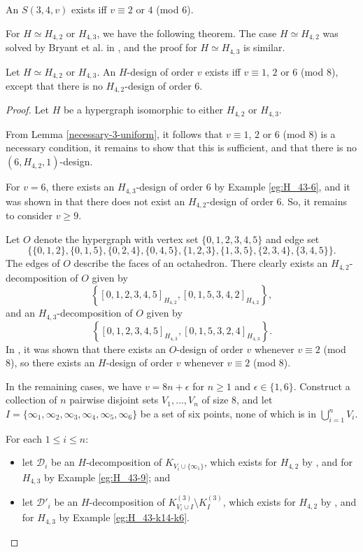 \begin{theorem} \label{thm:K4^3}
An $S(3, 4, v)$ exists iff $v \equiv 2$ or $4$ (mod $6$).
\end{theorem}


For $H \simeq H_{4,2}$ or $H_{4,3}$, we have the following theorem.
The case $H \simeq H_{4,2}$ was solved by Bryant et al. in \cite{bryant}, and the proof for $H \simeq H_{4,3}$ is similar.

\begin{theorem} \label{thm:H_42,H_43}
Let $H \simeq H_{4,2}$ or $H_{4,3}$.
An $H$-design of order $v$ exists iff $v \equiv 1$, $2$ or $6$ (mod $8$),
  except that there is no $H_{4,2}$-design of order $6$.
\end{theorem}

\begin{proof}
Let $H$ be a hypergraph isomorphic to either $H_{4,2}$ or $H_{4,3}$.

From Lemma \ref{necessary-3-uniform}, it follows that $v \equiv 1$, $2$ or $6$ (mod $8$) is a necessary condition,
   it remains to show that this is sufficient, and that there is no $(6, H_{4,2}, 1)$-design.

For $v = 6$, there exists an $H_{4,3}$-design of order 6 by Example \ref{eg:H_43-6},
  and it was shown in \cite{bryant} that there does not exist an $H_{4,2}$-design of order 6. So, it remains to consider $v \geq 9$.

Let $O$ denote the hypergraph with vertex set $\{0,1,2,3,4,5\}$ and edge set
\[
    \{\{0,1,2\},\{0,1,5\},\{0,2,4\},\{0,4,5\},\{1,2,3\},\{1,3,5\},\{2,3,4\},\{3,4,5\}\}.
\]
The edges of $O$ describe the faces of an octahedron.
There clearly exists an $H_{4,2}$-decomposition of $O$ given by \[ \left\{ [0,1,2,3,4,5]_{H_{4,2}}, [0,1,5,3,4,2]_{H_{4,2}} \right\}, \]
  and an $H_{4,3}$-decomposition of $O$ given by \[ \left\{[0,1,2,3,4,5]_{H_{4,3}}, [0,1,5,3,2,4]_{H_{4,3}} \right\}. \]
In \cite{hanani}, it was shown that there exists an $O$-design of order $v$ whenever $v \equiv 2$ (mod 8),
  so there exists an $H$-design of order $v$ whenever $v \equiv 2$ (mod 8).


In the remaining cases, we have $v = 8n + \epsilon$ for $n \geq 1$ and $\epsilon \in \{1,6\}$.
Construct a collection of $n$ pairwise disjoint sets $V_1, \ldots, V_n$ of size 8,
  and let $I = \{\infty_1, \infty_2, \infty_3, \infty_4, \infty_5, \infty_6\}$ be a set of six points, none of which is in $\bigcup_{i=1}^{n} V_i$.

For each $1 \leq i \leq n$:
\begin{itemize}
  \item let $\mathcal{D}_i$ be an $H$-decomposition of $K_{V_i \cup \{\infty_1\}}$, which exists for $H_{4,2}$ by \cite{bryant}, and for $H_{4,3}$ by Example \ref{eg:H_43-9}; and
  \item let $\mathcal{D}'_i$ be an $H$-decomposition of $K_{V_i \cup I}^{(3)} \setminus K_{I}^{(3)}$, which exists for $H_{4,2}$ by \cite{bryant}, and for $H_{4,3}$ by Example \ref{eg:H_43-k14-k6}.
\end{itemize}


\end{proof}
